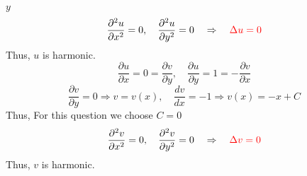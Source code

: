 \item[54.] $y$
\[
\frac{\partial^2 u}{\partial x^2} = 0, \quad \frac{\partial^2 u}{\partial y^2} = 0 \quad \Rightarrow \quad \textcolor{red}{\Delta u = 0}
\]
Thus, $u$ is harmonic.
\[
\frac{\partial u}{\partial x} = 0 = \frac{\partial v}{\partial y}, \quad 
\frac{\partial u}{\partial y} = 1 = -\frac{\partial v}{\partial x}
\]
\[
\frac{\partial v}{\partial y} = 0 \Rightarrow v = v(x), \quad
\frac{dv}{dx} = -1 \Rightarrow v(x) = -x + C
\]
Thus,
For this question we choose $C = 0$
\answer{\[
f(z) =  y - ix
\]}
\[
\frac{\partial^2 v}{\partial x^2} = 0, \quad \frac{\partial^2 v}{\partial y^2} = 0 \quad \Rightarrow \quad \textcolor{red}{\Delta v = 0}
\]
Thus, $v$ is harmonic.